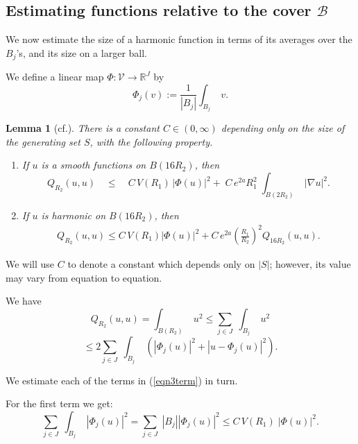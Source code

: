 \documentclass[12pt]{amsart}
\numberwithin{equation}{section}
\theoremstyle{plain}
\newtheorem{lemma}[equation]{Lemma}
\theoremstyle{remark}
\theoremstyle{definition}
\newcommand{\ra}{\rightarrow}
\newcommand{\B}{{\mathcal B}}
\newcommand{\R}{\mathbb R}
\newcommand{\V}{{\mathcal V}}
\def\ra{\rightarrow}
\def\defeq{:=}
\begin{document}
\subsection{Estimating functions relative to the cover $\B$}
We now estimate the size of a  harmonic function
in terms of its averages over the $B_j$'s, and its 
size on a larger ball.


We define a linear map $\Phi:\V\ra \R^J$ by
$$
\Phi_j(v)\defeq \frac{1}{|B_j|}\int_{B_j}\;v.
$$



\begin{lemma}[cf.]
There is a constant $C\in(0,\infty)$ depending only
on the size of the generating set $S$, with the following property. 

\begin{enumerate}

\item
If $u$ is a smooth functions on $B(16R_2)$, then
\begin{equation}
\label{eqnnonharmonicbound}
Q_{R_2}(u,u)
\quad\leq\quad C\,V(R_1)\,|\Phi(u)|^2
+\;C\,e^{2a}R_1^2\;
\int_{B(2R_2)}\;|\nabla u|^2.
\end{equation}

\item  If $u$ is harmonic on $B(16R_2)$, then
\begin{equation}
\label{eqnharmonicbound}
\begin{aligned}
Q_{R_2}(u,u)
\leq C\,V(R_1)|\Phi(u)|^2+
C\,e^{2a}\left(\frac{R_1}{R_2}\right)^2
Q_{16R_2}(u,u).
\end{aligned}
\end{equation}
\end{enumerate}
\end{lemma}
\proof
We will use $C$ to denote a constant which depends 
only on $|S|$; however, its value may vary from equation to 
equation.


We have
$$
Q_{R_2}(u,u)=\int_{B(R_2)}\;u^2
\leq \sum_{j\in J}\;\int_{B_j}\;u^2
$$
\begin{equation}
\label{eqn3term}
\leq 2\sum_{j\in J}\;\int_{B_j}\;
\left(|\Phi_j(u)|^2+
|u-\Phi_j(u)|^2\right).
\end{equation}

We estimate each of the terms in (\ref{eqn3term})
in turn.

For the first term we get:
\begin{equation}
\label{eqnfirstterm}
\sum_{j\in J}\;\int_{B_j}\;|\Phi_j(u)|^2
=\sum_{j\in J}\;|B_j|\left|\Phi_j(u)\right|^2
\leq C\,V(R_1)\;|\Phi(u)|^2.
\end{equation}
\end{document}
